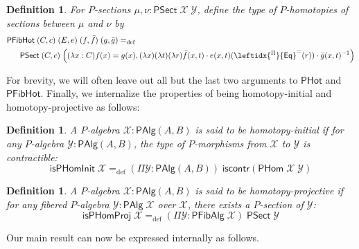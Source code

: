 \documentclass[10pt,a4paper,oneside,reqno]{amsart}
\numberwithin{equation}{section}
\theoremstyle{mythm}
\theoremstyle{mydef}
\newtheorem{definition}[theorem]{Definition}
\theoremstyle{myrmk}
\newcommand{\defeq}{=_{\mathrm{def}}}
\newcommand{\ct}{\cdot}
\newcommand{\iscontr}{\mathsf{iscontr}}
\newcommand{\funext}{\leftidx{^\Pi}{\mathsf{Eq}}^{=}}
\newcommand{\WCell}{\mathsf{PHot}}
\newcommand{\WFibCell}{\mathsf{PFibHot}}
\newcommand{\WAlg}{\mathsf{PAlg}}
\newcommand{\WFibAlg}{\mathsf{PFibAlg}}
\newcommand{\WHom}{\mathsf{PHom}}
\newcommand{\WFibHom}{\mathsf{PSect}}
\newcommand{\IsWHInit}{\mathsf{isPHomInit}}
\newcommand{\IsWHProj}{\mathsf{isPHomProj}}
\newcommand{\X}{\mathcal{X}}
\newcommand{\Y}{\mathcal{Y}}
\begin{document}
\begin{definition}\label{def:WFibCell}
For $P$-sections $\mu, \nu : \WFibHom \; \X \; \Y$, define the type of \emph{$P$-homotopies of sections} between $\mu$ and $\nu$ by
\begin{align*}
& \WFibCell \; (C,c) \; (E, e) \; (f,\bar{f}) \; (g,\bar{g}) \defeq \\ & \;\;\; \;\;\;\WFibHom \; (C,c) \; \Big((\lambda x:C) f(x) = g(x), (\lambda x) (\lambda t) (\lambda r) \bar{f}(x,t) \ct e(x,t)(\funext(r)) \ct \bar{g}(x,t)^{-1}\Big)
\end{align*}
\end{definition}

For brevity, we will often leave out all but the last two arguments to $\WCell$ and $\WFibCell$. Finally, we internalize the properties of being homotopy-initial and homotopy-projective as follows:

\begin{definition}\label{def:WHInit}
A $P$-algebra $\X : \WAlg(A,B)$ is said to be \emph{homotopy-initial} if for any $P$-algebra $\Y : \WAlg(A,B)$, the type of $P$-morphisms from $\X$ to $\Y$ is contractible:
\[ \IsWHInit \; \X \defeq (\Pi \Y:\WAlg(A,B)) \; \iscontr(\WHom \; \X \; \Y) \]  
\end{definition}

\begin{definition}\label{def:WHProj}
A $P$-algebra $\X : \WAlg(A,B)$ is said to be \emph{homotopy-projective} if for any fibered $P$-algebra $\Y : \WAlg \; \X$ over $\X$, there exists a $P$-section of $\Y$:
\[ \IsWHProj \; \X \defeq (\Pi \Y:\WFibAlg \; \X) \; \WFibHom \; \Y \]  
\end{definition}

Our main result can now be expressed internally as follows.
\end{document}
